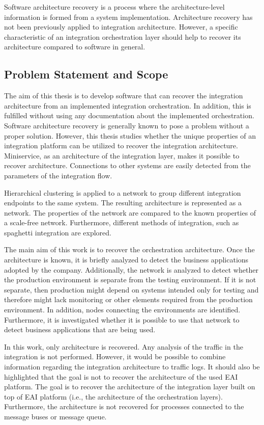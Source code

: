 \documentclass[english, 12pt, a4paper, sci, utf8, a-2b, online, obeyspaces]{aaltothesis}
\begin{document}
Software architecture recovery is a process where the architecture-level information is formed from a system implementation. Architecture recovery has not been previously applied to integration architecture. However, a specific characteristic of an integration orchestration layer should help to recover its architecture compared to software in general.

\subsection{Problem Statement and Scope}
The aim of this thesis is to develop software that can recover the integration architecture from an implemented integration orchestration. In addition, this is fulfilled without using any documentation about the implemented orchestration. Software architecture recovery is generally known to pose a problem without a proper solution. However, this thesis studies whether the unique properties of an integration platform can be utilized to recover the integration architecture. Miniservice, as an architecture of the integration layer, makes it possible to recover architecture. Connections to other systems are easily detected from the parameters of the integration flow.

Hierarchical clustering is applied to a network to group different integration endpoints to the same system. The resulting architecture is represented as a network. The properties of the network are compared to the known properties of a scale-free network. Furthermore, different methods of integration, such as spaghetti integration are explored.

The main aim of this work is to recover the orchestration architecture. Once the architecture is known, it is briefly analyzed to detect the business applications adopted by the company. Additionally, the network is analyzed to detect whether the production environment is separate from the testing environment. If it is not separate, then production might depend on systems intended only for testing and therefore might lack monitoring or other elements required from the production environment. In addition, nodes connecting the environments are identified. Furthermore, it is investigated whether it is possible to use that network to detect business applications that are being used.

In this work, only architecture is recovered. Any analysis of the traffic in the integration is not performed. However, it would be possible to combine information regarding the integration architecture to traffic logs. It should also be highlighted that the goal is not to recover the architecture of the used EAI platform. The goal is to recover the architecture of the integration layer built on top of EAI platform (i.e., the architecture of the orchestration layers). Furthermore, the architecture is not recovered for processes connected to the message buses or message queue.
\end{document}
